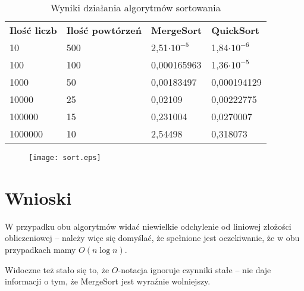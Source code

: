 \documentclass[a4paper,10pt]{article}
\begin{document}
\begin{center}
\begin{table}[h]
\caption{Wyniki działania algorytmów sortowania}
\begin{tabular}{llll}
\textbf{Ilość liczb} & \textbf{Ilość powtórzeń} & \textbf{MergeSort} & \textbf{QuickSort}\\
10 & 500 & 2,51\(\cdot 10^{-5}\) & 1,84\(\cdot 10^{-6}\)\\
100 & 100 & 0,000165963 & 1,36\(\cdot 10^{-5}\)\\
1000 & 50 & 0,00183497 & 0,000194129\\
10000 & 25 & 0,02109 & 0,00222775\\
100000 & 15 & 0,231004 & 0,0270007\\
1000000 & 10 & 2,54498 & 0,318073
\end{tabular}

\end{table}
\end{center}

\begin{figure}[h]
 \texttt{[image: sort.eps]}
\end{figure}

\section{Wnioski}

\par W przypadku obu algorytmów widać niewielkie odchylenie od liniowej
złożości obliczeniowej -- należy więc się domyślać, że spełnione jest
oczekiwanie, że w obu przypadkach mamy \(O(n \log n)\).

\par Widoczne też stało się to, że \(O\)-notacja ignoruje czynniki
stałe -- nie daje informacji o tym, że MergeSort jest wyraźnie
wolniejszy.
\end{document}
